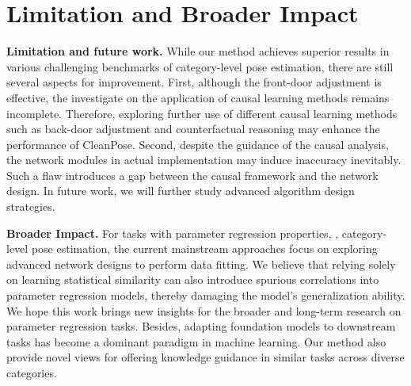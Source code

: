 \clearpage
\setcounter{page}{1}
\setcounter{section}{0}
\maketitlesupplementary
\renewcommand\thesection{\Alph{section}}

\section{Limitation and Broader Impact}
\label{sec:suppl_limitation}
\noindent
{\bf Limitation and future work.} While our method achieves superior results in various challenging benchmarks of category-level pose estimation, there are still several aspects for improvement. First, although the front-door adjustment is effective, the investigate on the application of causal learning methods remains incomplete. Therefore, exploring further use of different causal learning methods such as back-door adjustment and counterfactual reasoning may enhance the performance of CleanPose.
Second, despite the guidance of the causal analysis, the network modules in actual implementation may induce inaccuracy inevitably. Such a flaw introduces a gap between the causal framework and the network design. In future work, we will further study advanced algorithm design strategies.

\vspace{0.1cm}
\noindent
{\bf Broader Impact.} For tasks with parameter regression properties, \eg, category-level pose estimation, the current mainstream approaches focus on exploring advanced network designs to perform data fitting. We believe that relying solely on learning statistical similarity can also introduce spurious correlations into parameter regression models, thereby damaging the model's generalization ability. We hope this work brings new insights for the broader and long-term research on parameter regression tasks.
Besides, adapting foundation models to downstream tasks has become a dominant paradigm in machine learning. Our method also provide novel views for offering knowledge guidance in similar tasks across diverse categories.


